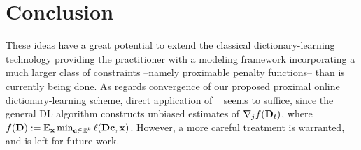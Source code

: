 \section{Conclusion}
These ideas have a great potential to extend the classical dictionary-learning technology providing the practitioner with a modeling framework incorporating a much larger class of constraints --namely proximable penalty functions-- than is currently being done.
As regards convergence of our proposed proximal online dictionary-learning scheme, direct application of ~\citep{fercoq2015} seems to suffice, since the general DL algorithm constructs unbiased estimates of $\nabla_j f(\mathbf{D}_t)$, where $f(\mathbf{D}) := \mathbb E_{\mathbf{x}}\min_{\mathbf{c} \in \mathbb R^k}\ell (\mathbf{D}\mathbf{c}, \mathbf{x})$. However, a more careful treatment is warranted, and is left for future work.





